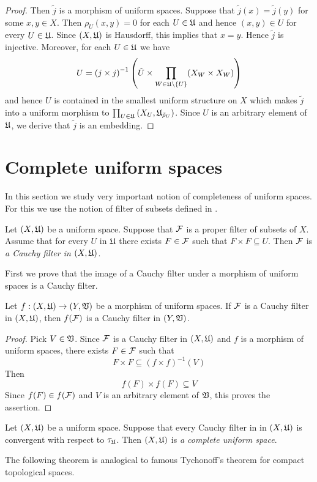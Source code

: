 \begin{proof}
Then $\tilde{j}$ is a morphism of uniform spaces. Suppose that $\tilde{j}(x) = \tilde{j}(y)$ for some $x,y\in X$. Then $\rho_U(x,y) = 0$ for each $U \in {\mathfrak U}$ and hence $(x,y) \in U$ for every $U\in {\mathfrak U}$. Since $(X,{\mathfrak U})$ is Hausdorff, this implies that $x = y$. Hence $\tilde{j}$ is injective. Moreover, for each $U \in {\mathfrak U}$ we have
$$U = \left(j\times j\right)^{-1}\left(\tilde{U}\times \prod_{W\in {\mathfrak U}\setminus \{U\}}(X_W\times X_W)\right)$$
and hence $U$ is contained in the smallest uniform structure on $X$ which makes $\tilde{j}$ into a uniform morphism to $\prod_{U\in {\mathfrak U}}\left(X_U,{\mathfrak U}_{\tilde{\rho}_U}\right)$. Since $U$ is an arbitrary element of ${\mathfrak U}$, we derive that $\tilde{j}$ is an embedding.
\end{proof}

\section{Complete uniform spaces}
\noindent
In this section we study very important notion of completeness of uniform spaces. For this we use the notion of filter of subsets defined in \cite{Filters_in_topology}.

\begin{definition}
Let $(X,{\mathfrak U})$ be a uniform space. Suppose that ${\mathcal F}$ is a proper filter of subsets of $X$. Assume that for every $U$ in ${\mathfrak U}$ there exists $F \in {\mathcal F}$ such that $F\times F\subseteq U$. Then ${\mathcal F}$ is \textit{a Cauchy filter in $\left(X,{\mathfrak U}\right)$}.
\end{definition}
\noindent
First we prove that the image of a Cauchy filter under a morphism of uniform spaces is a Cauchy filter.

\begin{fact}\label{fact:images_of_Cauchy_filters_under_uniform_morphisms_are_Cauchy}
Let $f:\left(X,{\mathfrak U}\right)\rightarrow \left(Y,{\mathfrak V}\right)$ be a morphism of uniform spaces. If ${\mathcal F}$ is a Cauchy filter in $\left(X,{\mathfrak U}\right)$, then $f({\mathcal F})$ is a Cauchy filter in $\left(Y,{\mathfrak V}\right)$.
\end{fact}
\begin{proof}
Pick $V \in {\mathfrak V}$. Since ${\mathcal F}$ is a Cauchy filter in $\left(X,{\mathfrak U}\right)$ and $f$ is a morphism of uniform spaces, there exists $F \in {\mathcal F}$ such that $$F\times F \subseteq (f\times f)^{-1}(V)$$
Then
$$f(F)\times f(F)\subseteq V$$
Since $f(F) \in f({\mathcal F})$ and $V$ is an arbitrary element of ${\mathfrak V}$, this proves the assertion.
\end{proof}

\begin{definition}
Let $(X,{\mathfrak U})$ be a uniform space. Suppose that every Cauchy filter in in $\left(X,{\mathfrak U}\right)$ is convergent with respect to $\tau_{{\mathfrak U}}$. Then $\left(X,{\mathfrak U}\right)$ is \textit{a complete uniform space}. 
\end{definition}
\noindent
The following theorem is analogical to famous Tychonoff's theorem for compact topological spaces.

